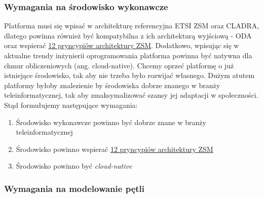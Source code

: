 \subsubsection{Wymagania na środowisko wykonawcze}

Platforma musi się wpisać w architekturę referencyjna ETSI ZSM oraz CLADRA, dlatego powinna również być kompatybilna z ich architekturą wyjściową - ODA \cite{tmforum2018} oraz wspierać \hyperlink{sec:zsm}{12 pryncypiów architektury ZSM}. Dodatkowo, wpisując się w aktualne trendy inżynierii oprogramowania platforma powinna być natywna dla chmur obliczeniowych (ang. cloud-native). Chcemy oprzeć platformę o już istniejące środowisko, tak aby nie trzeba było rozwijać własnego. Dużym atutem platformy byłoby znalezienie by środowiska dobrze znanego w branży teleinformatycznej, tak aby zmaksymalizować szansy jej adaptacji w społeczności.  Stąd formułujemy następujące wymagania:

\begin{enumerate}
    \setcounter{enumi}{0} 
    \item \label{req:1} Środowisko wykonawcze powinno być dobrze znane w branży teleinformatycznej
    \item \label{req:2} Środowisko powinno wspierać \hyperlink{list:2}{12 pryncypiów architektury ZSM}
    \item \label{req:3} Środowisko powinno być \textit{cloud-native}
\end{enumerate}

\subsubsection{Wymagania na modelowanie pętli}

